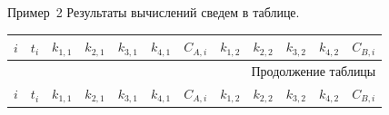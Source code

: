 \documentclass[aspectratio=169, mathserif]{beamer}	%
\begin{document}
\begin{frame}[fragile, label=c]{Пример~2}
\scriptsize
Результаты вычислений сведем в таблице.
\vfill
{}
\renewcommand{\arraystretch}{1.5}
\begin{longtable}{|r|r|r|r|r|r|r|r|r|r|r|r|}
	\hline
	\multicolumn{1}{|r|}{$i$} & \multicolumn{1}{r|}{$t_i$} & \multicolumn{1}{r|}{$k_{1,1}$} & \multicolumn{1}{r|}{$k_{2,1}$} & \multicolumn{1}{r|}{$k_{3,1}$} & \multicolumn{1}{r|}{$k_{4,1}$} & \multicolumn{1}{r|}{$C_{A,i}$} & \multicolumn{1}{r|}{$k_{1,2}$} & \multicolumn{1}{r|}{$k_{2,2}$} & \multicolumn{1}{r|}{$k_{3,2}$} & \multicolumn{1}{r|}{$k_{4,2}$} & \multicolumn{1}{r|}{$C_{B,i}$}  \\
	\hline
	\endfirsthead

	\multicolumn{12}{r}{Продолжение таблицы \thetable{}} \\
	\hline
	\multicolumn{1}{|r|}{$i$} & \multicolumn{1}{r|}{$t_i$} & \multicolumn{1}{r|}{$k_{1,1}$} & \multicolumn{1}{r|}{$k_{2,1}$} & \multicolumn{1}{r|}{$k_{3,1}$} & \multicolumn{1}{r|}{$k_{4,1}$} & \multicolumn{1}{r|}{$C_{A,i}$} & \multicolumn{1}{r|}{$k_{1,2}$} & \multicolumn{1}{r|}{$k_{2,2}$} & \multicolumn{1}{r|}{$k_{3,2}$} & \multicolumn{1}{r|}{$k_{4,2}$} & \multicolumn{1}{r|}{$C_{B,i}$}  \\
	\hline
	\endhead


\end{longtable}
\end{frame}
\end{document}
